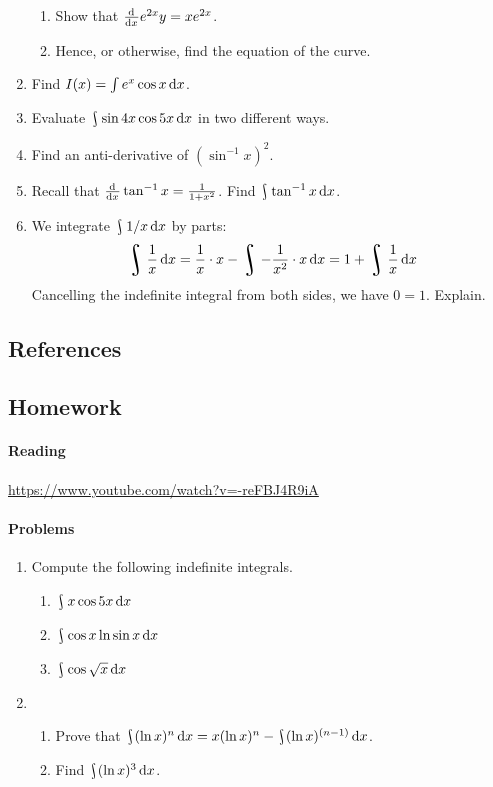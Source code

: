\begin{enumerate}
\begin{enumerate}
          \item Show that $ \od{}{x} e^{2x} y = xe^{2x} $.
          \item Hence, or otherwise, find the equation of the curve.
        \end{enumerate}
  \item Find $ I(x) = \int e^x \cos x \dif{x} $.
  \item Evaluate $ \rint \sin 4x \cos 5x \dif{x} $ in two different ways.
  \item Find an anti-derivative of $ (\sin^{-1} x)^2 $.
  \item Recall that $ \od{}{x} \tan^{-1} x = \frac{1}{1 + x^2} $. Find $ \rint \tan^{-1} x \dif{x} $.
  \item We integrate $ \rint 1/x \dif{x} $ by parts:
        \begin{align*}
          \rint \frac{1}{x} \dif{x} = \frac{1}{x} \cdot x - \rint -\frac{1}{x^2} \cdot x \dif{x} = 1 + \rint \frac{1}{x} \dif{x}
        \end{align*}
        Cancelling the indefinite integral from both sides, we have $ 0 = 1 $. Explain.
\end{enumerate}

\subsection{References}

\subsection{Homework}
\paragraph{Reading}
\url{https://www.youtube.com/watch?v=-reFBJ4R9iA}

\paragraph{Problems}
\begin{enumerate}
  \item Compute the following indefinite integrals.
    \begin{enumerate}
      \item $ \rint x \cos 5x \dif{x} $
      \item $ \rint \cos x \ln \sin x \dif{x} $
      \item $ \rint \cos \sqrt{x} \dif{x} $
    \end{enumerate}
  \item
    \begin{enumerate}
      \item Prove that $ \rint (\ln x)^n \dif{x} = x(\ln x)^n - \rint (\ln x)^{(n-1)} \dif{x} $.
      \item Find $ \rint (\ln x)^3 \dif{x} $.
    \end{enumerate}
\end{enumerate}
